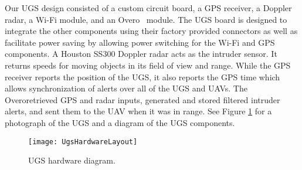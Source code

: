 \documentclass[letterpaper, 12 pt, conference]{ieeeconf}  %
\DeclareRobustCommand{\overo}{Overo\textsuperscript{\textregistered}}
\theoremstyle{definition}
\begin{document}
Our UGS design consisted of a custom circuit board, a GPS receiver, a Doppler radar, a Wi-Fi module, and an \overo~ module. The UGS board is designed to integrate the other components using their factory provided connectors as well as facilitate power saving by allowing power switching for the Wi-Fi and GPS components. A Houston SS300 Doppler radar\cite{houstonradar} acts as the intruder sensor. It returns speeds for moving objects in its field of view and range. While the GPS receiver reports the position of the UGS, it also reports the GPS time which allows synchronization of alerts over all of the UGS and UAVs. The \overo retrieved GPS and radar inputs, generated and stored filtered intruder alerts, and sent them to the UAV when it was in range. See Figure \ref{fig:UgsHardwareLayout} for a photograph of the UGS and a diagram of the UGS components.

\begin{figure}[htb]
\centering
      \texttt{[image: UgsHardwareLayout]}
      \caption{UGS hardware diagram.}
      \label{fig:UgsHardwareLayout}
\end{figure}
\end{document}
